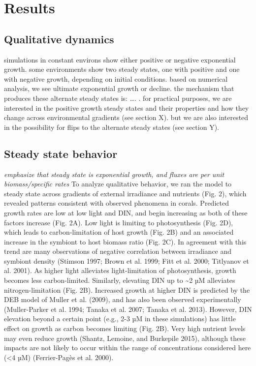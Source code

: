 \documentclass[]{elsarticle} %
\begin{document}
\section{Results}\label{results}

\subsection{Qualitative dynamics}\label{qualitative-dynamics}

simulations in constant environs show either positive or negative
exponential growth. some environments show two steady states, one with
positive and one with negative growth, depending on initial conditions.
based on numerical analysis, we see ultimate exponential growth or
decline. the mechanism that produces these alternate steady states is:
\ldots{}. . for practical purposes, we are interested in the positive
growth steady states and their properties and how they change across
environmental gradients (see section X). but we are also interested in
the possibility for flips to the alternate steady states (see section
Y).

\subsection{Steady state behavior}\label{steady-state-behavior}

\emph{emphasize that steady state is exponential growth, and fluxes are
per unit biomass/specific rates} To analyze qualitative behavior, we ran
the model to steady state across gradients of external irradiance and
nutrients (Fig. 2), which revealed patterns consistent with observed
phenomena in corals. Predicted growth rates are low at low light and
DIN, and begin increasing as both of these factors increase (Fig. 2A).
Low light is limiting to photosynthesis (Fig. 2D), which leads to
carbon-limitation of host growth (Fig. 2B) and an associated increase in
the symbiont to host biomass ratio (Fig. 2C). In agreement with this
trend are many observations of negative correlation between irradiance
and symbiont density (Stimson 1997; Brown et al. 1999; Fitt et al. 2000;
Titlyanov et al. 2001). As higher light alleviates light-limitation of
photosynthesis, growth becomes less carbon-limited. Similarly, elevating
DIN up to \textasciitilde{}2 µM alleviates nitrogen-limitation (Fig.
2B). Increased growth at higher DIN is predicted by the DEB model of
Muller et al. (2009), and has also been observed experimentally
(Muller-Parker et al. 1994; Tanaka et al. 2007; Tanaka et al. 2013).
However, DIN elevation beyond a certain point (e.g., 2-3 µM in these
simulations) has little effect on growth as carbon becomes limiting
(Fig. 2B). Very high nutrient levels may even reduce growth (Shantz,
Lemoine, and Burkepile 2015), although these impacts are not likely to
occur within the range of concentrations considered here (\textless{}4
µM) (Ferrier-Pagès et al. 2000).
\end{document}
